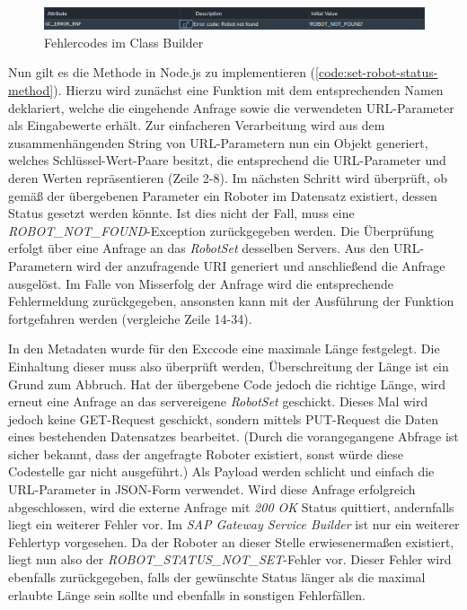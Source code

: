 \begin{figure}[ht]
	\centering
	\includegraphics[width=\textwidth]{Bilder/ABAP/2020-12-04 10_22_23-Class Builder_ Display Class ZCL_ZEWM_ROBCO_DPC_EXT_cut.png}
	\caption{Fehlercodes im Class Builder}
	\label{fig:class-builder}
\end{figure}

Nun gilt es die Methode in Node.js zu implementieren (\autoref{code:set-robot-status-method}).
Hierzu wird zunächst eine Funktion mit dem entsprechenden Namen deklariert, welche die eingehende Anfrage sowie die verwendeten URL-Parameter als Eingabewerte erhält.
Zur einfacheren Verarbeitung wird aus dem zusammenhängenden String von URL-Parametern nun ein Objekt generiert, welches Schlüssel-Wert-Paare besitzt, die entsprechend die URL-Parameter und deren Werten repräsentieren (Zeile 2-8).
Im nächsten Schritt wird überprüft, ob gemäß der übergebenen Parameter ein Roboter im Datensatz existiert, dessen Status gesetzt werden könnte.
Ist dies nicht der Fall, muss eine \emph{ROBOT\_NOT\_FOUND}-Exception zurückgegeben werden.
Die Überprüfung erfolgt über eine Anfrage an das \emph{RobotSet} desselben Servers.
Aus den URL-Parametern wird der anzufragende \ac{URI} generiert und anschließend die Anfrage ausgelöst.
Im Falle von Misserfolg der Anfrage wird die entsprechende Fehlermeldung zurückgegeben, ansonsten kann mit der Ausführung der Funktion fortgefahren werden (vergleiche Zeile 14-34).

In den Metadaten wurde für den Exccode eine maximale Länge festgelegt.
Die Einhaltung dieser muss also überprüft werden, Überschreitung der Länge ist ein Grund zum Abbruch.
Hat der übergebene Code jedoch die richtige Länge, wird erneut eine Anfrage an das servereigene \emph{RobotSet} geschickt.
Dieses Mal wird jedoch keine GET-Request geschickt, sondern mittels PUT-Request die Daten eines bestehenden Datensatzes bearbeitet.
(Durch die vorangegangene Abfrage ist sicher bekannt, dass der angefragte Roboter existiert, sonst würde diese Codestelle gar nicht ausgeführt.)
Als Payload werden schlicht und einfach die URL-Parameter in \ac{JSON}-Form verwendet.
Wird diese Anfrage erfolgreich abgeschlossen, wird die externe Anfrage mit \emph{200 OK} Status quittiert, andernfalls liegt ein weiterer Fehler vor.
Im \emph{SAP Gateway Service Builder} ist nur ein weiterer Fehlertyp vorgesehen.
Da der Roboter an dieser Stelle erwiesenermaßen existiert, liegt nun also der \emph{ROBOT\_STATUS\_NOT\_SET}-Fehler vor.
Dieser Fehler wird ebenfalls zurückgegeben, falls der gewünschte Status länger als die maximal erlaubte Länge sein sollte und ebenfalls in sonstigen Fehlerfällen.

